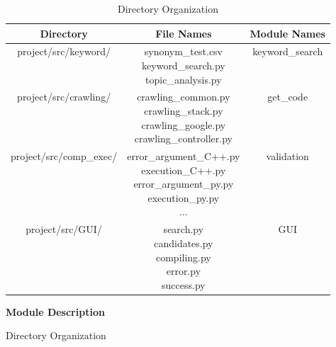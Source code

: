 \documentclass[conference]{IEEEtran}
\begin{document}
\begin{itemize}
\begin{itemize}
\begin{itemize}
\begin{itemize}
\begin{figure}[h]
\begin{enumerate}
\begin{itemize}
\begin{enumerate}
\begin{table}[ht]
\renewcommand{\arraystretch}{1.3}
\caption{Directory Organization}
\label{table:directory_org}
\centering
\begin{adjustbox}{width=0.5\textwidth}
\small
\begin{tabular}{c||c||c}
\hline
\bfseries Directory & \bfseries File Names & \bfseries Module Names \\
\hline\hline
project/src/keyword/  & \parbox[t]{5cm}{synonym\_test.csv \\ keyword\_search.py \\ topic\_analysis.py} & \parbox[t]{5cm}{keyword\_search}\\
\hline
project/src/crawling/ & \parbox[t]{5cm}{crawling\_common.py \\ crawling\_stack.py \\ crawling\_google.py \\ crawling\_controller.py} & \parbox[t]{5cm}{get\_code}\\
\hline
project/src/comp\_exec/ &\parbox[t]{5cm}{error\_argument\_C++.py \\ execution\_C++.py \\ error\_argument\_py.py \\ execution\_py.py \\ ... } & \parbox[t]{5cm}{validation}\\
\hline
project/src/GUI/ & \parbox[t]{5cm}{search.py \\candidates.py \\ compiling.py \\ error.py \\ success.py} & \parbox[t]{5cm}{GUI}\\
\hline

\end{tabular}
\end{adjustbox}
\end{table}

\textbf{Module Description}


\end{enumerate}
\end{itemize}
\end{enumerate}
\end{figure}
\end{itemize}
\end{itemize}
\end{itemize}
\end{itemize}
\end{document}
